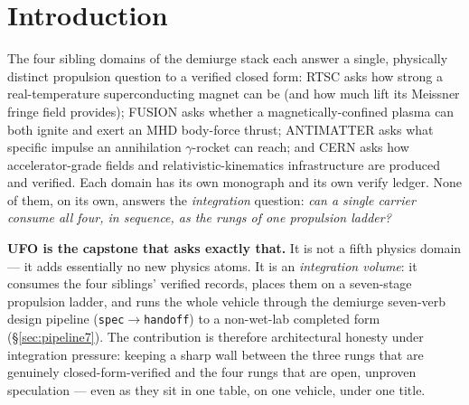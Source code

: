 \documentclass[11pt,a4paper]{article}
\begin{document}
\section{Introduction}
\label{sec:intro}

The four sibling domains of the demiurge stack each answer a single,
physically distinct propulsion question to a verified closed form: RTSC
asks how strong a real-temperature superconducting magnet can be (and
how much lift its Meissner fringe field provides); FUSION asks whether a
magnetically-confined plasma can both ignite and exert an MHD body-force
thrust; ANTIMATTER asks what specific impulse an annihilation
$\gamma$-rocket can reach; and CERN asks how accelerator-grade fields
and relativistic-kinematics infrastructure are produced and verified.
Each domain has its own monograph and its own verify ledger. None of
them, on its own, answers the \emph{integration} question: \emph{can a
single carrier consume all four, in sequence, as the rungs of one
propulsion ladder?}

\textbf{UFO is the capstone that asks exactly that.} It is not a fifth
physics domain --- it adds essentially no new physics atoms. It is an
\emph{integration volume}: it consumes the four siblings' verified
records, places them on a seven-stage propulsion ladder, and runs the
whole vehicle through the demiurge seven-verb design pipeline
(\texttt{spec}$\to$\texttt{handoff}) to a non-wet-lab completed form
(\S\ref{sec:pipeline7}). The contribution is therefore architectural
honesty under integration pressure: keeping a sharp wall between the
three rungs that are genuinely closed-form-verified and the four rungs
that are open, unproven speculation --- even as they sit in one table,
on one vehicle, under one title.
\end{document}
